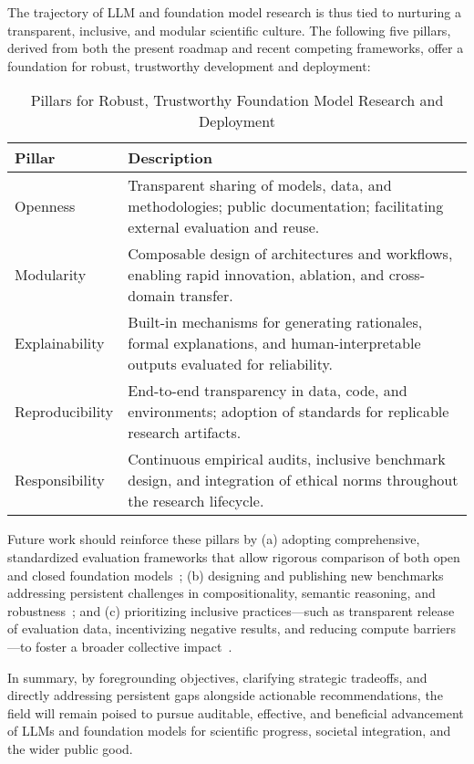 \documentclass[sigconf]{acmart}
\begin{document}
The trajectory of LLM and foundation model research is thus tied to nurturing a transparent, inclusive, and modular scientific culture. The following five pillars, derived from both the present roadmap and recent competing frameworks, offer a foundation for robust, trustworthy development and deployment:

\begin{table*}[htbp]
\centering
\caption{Pillars for Robust, Trustworthy Foundation Model Research and Deployment}
\label{tab;pillars_future}
\begin{adjustbox}{max width=\textwidth}
\begin{tabular}{ll}
\toprule
\textbf{Pillar} & \textbf{Description} \\
\midrule
Openness        & Transparent sharing of models, data, and methodologies; public documentation; facilitating external evaluation and reuse. \\
Modularity      & Composable design of architectures and workflows, enabling rapid innovation, ablation, and cross-domain transfer. \\
Explainability  & Built-in mechanisms for generating rationales, formal explanations, and human-interpretable outputs evaluated for reliability. \\
Reproducibility & End-to-end transparency in data, code, and environments; adoption of standards for replicable research artifacts. \\
Responsibility  & Continuous empirical audits, inclusive benchmark design, and integration of ethical norms throughout the research lifecycle. \\
\bottomrule
\end{tabular}
\end{adjustbox}
\end{table*}

Future work should reinforce these pillars by (a) adopting comprehensive, standardized evaluation frameworks that allow rigorous comparison of both open and closed foundation models~\cite{ref94,ref95,ref96,ref97,ref101,ref105}; (b) designing and publishing new benchmarks addressing persistent challenges in compositionality, semantic reasoning, and robustness~\cite{ref94,ref96,ref97,ref99,ref105}; and (c) prioritizing inclusive practices---such as transparent release of evaluation data, incentivizing negative results, and reducing compute barriers---to foster a broader collective impact~\cite{ref92,ref107,ref108}.

In summary, by foregrounding objectives, clarifying strategic tradeoffs, and directly addressing persistent gaps alongside actionable recommendations, the field will remain poised to pursue auditable, effective, and beneficial advancement of LLMs and foundation models for scientific progress, societal integration, and the wider public good.



\end{document}

